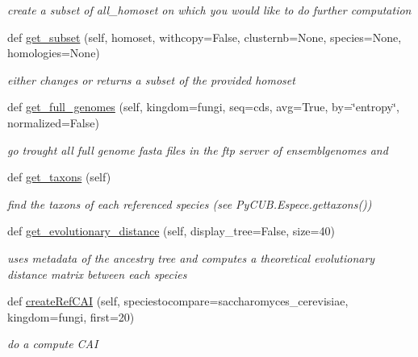 \begin{DoxyCompactItemize}
\begin{DoxyCompactList}\small\item\em create a subset of all\+\_\+homoset on which you would like to do further computation \end{DoxyCompactList}\item 
def \mbox{\hyperlink{class_py_c_u_b_1_1py_c_u_b_1_1_py_c_u_b_a9fab964d44e03b46d330b3754f5c39fb}{get\+\_\+subset}} (self, homoset, withcopy=False, clusternb=None, species=None, homologies=None)
\begin{DoxyCompactList}\small\item\em either changes or returns a subset of the provided homoset \end{DoxyCompactList}\item 
def \mbox{\hyperlink{class_py_c_u_b_1_1py_c_u_b_1_1_py_c_u_b_a53b60adfafbe019421d010c5fed04f5c}{get\+\_\+full\+\_\+genomes}} (self, kingdom=\textquotesingle{}fungi\textquotesingle{}, seq=\textquotesingle{}cds\textquotesingle{}, avg=True, by=\char`\"{}entropy\char`\"{}, normalized=False)
\begin{DoxyCompactList}\small\item\em go trought all full genome fasta files in the ftp server of ensemblgenomes and \end{DoxyCompactList}\item 
def \mbox{\hyperlink{class_py_c_u_b_1_1py_c_u_b_1_1_py_c_u_b_a4e9a2d43aacfc8d2fb1610140f2439f2}{get\+\_\+taxons}} (self)
\begin{DoxyCompactList}\small\item\em find the taxons of each referenced species (see Py\+C\+U\+B.\+Espece.\+gettaxons()) \end{DoxyCompactList}\item 
def \mbox{\hyperlink{class_py_c_u_b_1_1py_c_u_b_1_1_py_c_u_b_af0d7bed125f4437bea6b8051f9922c1d}{get\+\_\+evolutionary\+\_\+distance}} (self, display\+\_\+tree=False, size=40)
\begin{DoxyCompactList}\small\item\em uses metadata of the ancestry tree and computes a theoretical evolutionary distance matrix between each species \end{DoxyCompactList}\item 
def \mbox{\hyperlink{class_py_c_u_b_1_1py_c_u_b_1_1_py_c_u_b_a40a742a1a05fc21c7bced2c75fb93fc6}{create\+Ref\+C\+AI}} (self, speciestocompare=\textquotesingle{}saccharomyces\+\_\+cerevisiae\textquotesingle{}, kingdom=\textquotesingle{}fungi\textquotesingle{}, first=20)
\begin{DoxyCompactList}\small\item\em do a compute C\+AI \end{DoxyCompactList}\item 

\end{DoxyCompactItemize}
